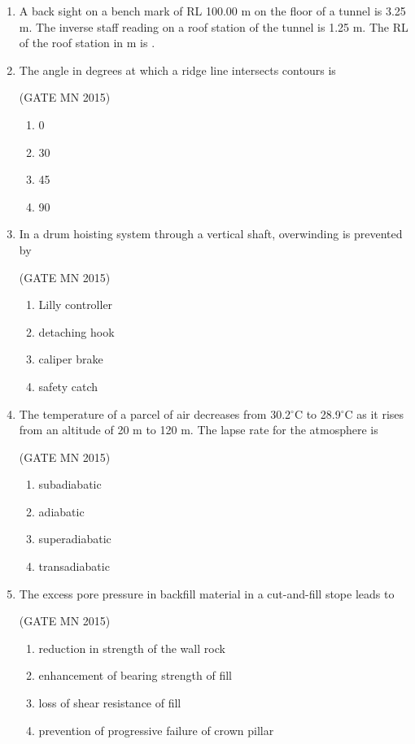 \documentclass[journal]{IEEEtran}
\begin{document}
\begin{enumerate}
\item A back sight on a bench mark of RL 100.00 m on the floor of a tunnel is 3.25 m. The inverse staff reading on a roof station of the tunnel is 1.25 m. The RL of the roof station in m is \underline    {\hspace{2cm}}.  




\item The angle in degrees at which a ridge line intersects contours is  

	\hfill(GATE MN 2015)
\begin{multicols}{4}
\begin{enumerate}
\item 0  
\item 30  
\item 45  
\item 90  
\end{enumerate}
\end{multicols}

\item In a drum hoisting system through a vertical shaft, overwinding is prevented by  


	\hfill(GATE MN 2015)
\begin{enumerate}
\item Lilly controller  
\item detaching hook  
\item caliper brake  
\item safety catch  
\end{enumerate}


\item The temperature of a parcel of air decreases from 30.2$^\circ$C to 28.9$^\circ$C as it rises from an altitude of 20 m to 120 m. The lapse rate for the atmosphere is 

	\hfill(GATE MN 2015)
\begin{multicols}{4}
\begin{enumerate}
\item subadiabatic  
\item adiabatic  
\item superadiabatic  
\item transadiabatic  
\end{enumerate}
\end{multicols}

\item The excess pore pressure in backfill material in a cut-and-fill stope leads to  


	\hfill(GATE MN 2015)
\begin{enumerate}
\item reduction in strength of the wall rock  
\item enhancement of bearing strength of fill  
\item loss of shear resistance of fill  
\item prevention of progressive failure of crown pillar  
\end{enumerate}


\end{enumerate}
\end{document}
